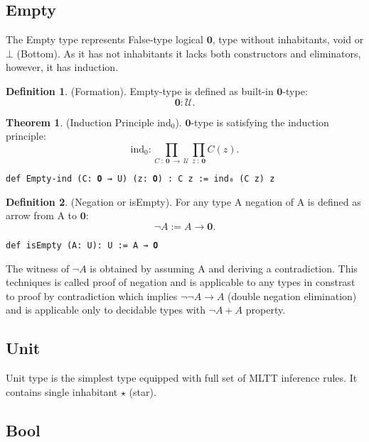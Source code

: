 \documentclass{article}
\theoremstyle{definition}
\newtheorem{theorem}{Theorem}
\newtheorem{definition}{Definition}
\begin{document}
\newpage
\subsection{Empty}

The Empty type represents False-type logical $\mathbf{0}$, type without inhabitants, void or $\bot$ (Bottom).
As it has not inhabitants it lacks both constructors and eliminators, however, it has induction.

\begin{definition} (Formation).
Empty-type is defined as built-in $\mathbf{0}$-type:
$$
 \mathbf{0} : \mathcal{U}.
$$
\end{definition}

\begin{theorem} (Induction Principle $\mathrm{ind_0}$).
$\mathbf{0}$-type is satisfying the induction principle:
$$
  \mathrm{ind_0} : \prod_{C\ :\ \mathbf{0}\ \rightarrow\ \mathcal{U}} \prod_{z\ :\ \mathbf{0}} C(z).
$$
\begin{lstlisting}
def Empty-ind (C: 𝟎 → U) (z: 𝟎) : C z := ind₀ (C z) z
\end{lstlisting}
\end{theorem}

\begin{definition} (Negation or isEmpty).
For any type A negation of A is defined as arrow from A to $\mathbf{0}$:
$$
  \neg A := A \rightarrow \mathbf{0}.
$$
\begin{lstlisting}
def isEmpty (A: U): U := A → 𝟎
\end{lstlisting}
\end{definition}

The witness of $\neg A$ is obtained by assuming A and deriving a contradiction.
This techniques is called proof of negation and is applicable to any types in constrast
to proof by contradiction which implies $\neg\neg A \rightarrow A$ (double negation elimination) and is
applicable only to decidable types with $\neg A + A$ property.

\newpage
\subsection{Unit}
Unit type is the simplest type equipped with full set of MLTT inference rules. It contains single inhabitant $\star$ (star).

\newpage
\subsection{Bool}
\end{document}
